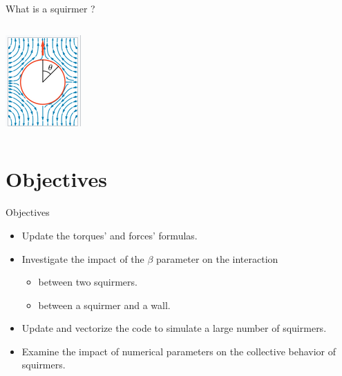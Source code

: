\documentclass{beamer}
\begin{document}
\begin{frame}{What is a squirmer ?}
\begin{columns}[T]
\begin{column}{0.5\textwidth}
            \includegraphics[width=\textwidth]{../images/squirmer.png}
            \cite{Wikipedia}
        \end{column}
    \end{columns}
\end{frame}

\section{Objectives}
\begin{frame}{Objectives}
    \begin{itemize}
        \item Update the torques' and forces' formulas.
        \item Investigate the impact of the $\beta$ parameter on the interaction
        \begin{itemize}
            \item between two squirmers.
            \item between a squirmer and a wall.
        \end{itemize}
        \item Update and vectorize the code to simulate a large number of squirmers.
        \item Examine the impact of numerical parameters on the collective behavior of squirmers.
    \end{itemize}
\end{frame}
\end{document}
